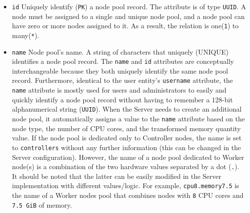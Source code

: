 \begin{itemize}
  \item \texttt{id}
    \newline
    Uniquely identify (\texttt{PK}) a node pool record.
    \newline
    The attribute is of type \texttt{UUID}.
    \newline
    A node must be assigned to a single and unique node pool, and a node pool can
    have zero or more nodes assigned to it. As a result, the relation is one(\texttt{1})
    to many(\texttt{*}).

  \item \texttt{name}
    \newline
    Node pool's name.
    \newline
    A string of characters that uniquely (UNIQUE) identifies a node pool record.
    \newline
    The \texttt{name} and \texttt{id} attributes are conceptually
    interchangeable because they both uniquely identify the same node pool
    record. Furthermore, identical to the user entity's \texttt{username} attribute,
    the \texttt{name} attribute is mostly used for users and administrators to easily
    and quickly identify a node pool record without having to remember a 128-bit
    alphanumerical string (\texttt{UUID}).
    \newline
    When the Server needs to create an additional node pool, it automatically
    assigns a value to the \texttt{name} attribute based on the node type, the
    number of CPU cores, and the transformed memory quantity value. If the node
    pool is dedicated only to Controller nodes, the name is set to \texttt{controllers}
    without any further information (this can be changed in the Server configuration).
    However, the name of a node pool dedicated to Worker node(s) is a combination
    of the two hardware values separated by a dot (\texttt{.}). It should be noted
    that the latter can be easily modified in the Server implementation with different
    values/logic.
    \newline
    For example, \texttt{cpu8.memory7.5} is the name of a Worker nodes pool that
    combines nodes with \texttt{8} CPU cores and \texttt{7.5 GiB} of memory.


\end{itemize}
